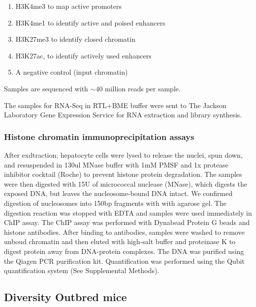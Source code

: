\documentclass[10pt,letterpaper]{article}
\providecommand{\tightlist}{%
  \setlength{\itemsep}{0pt}\setlength{\parskip}{0pt}}
\begin{document}
\begin{enumerate}
\def\labelenumi{\alph{enumi}.}
\tightlist
\item
  H3K4me3 to map active promoters
\item
  H3K4me1 to identify active and poised enhancers
\item
  H3K27me3 to identify closed chromatin
\item
  H3K27ac, to identify actively used enhancers
\item
  A negative control (input chromatin)
\end{enumerate}

Samples are sequenced with \(\sim40\) million reads per sample.

The samples for RNA-Seq in RTL+BME buffer were sent to The Jackson
Laboratory Gene Expression Service for RNA extraction and library
synthesis.

\hypertarget{histone-chromatin-immunoprecipitation-assays}{%
\subsubsection{Histone chromatin immunoprecipitation
assays}\label{histone-chromatin-immunoprecipitation-assays}}

After exdtraction, hepatocyte cells were lysed to release the nuclei,
spun down, and resuspended in 130ul MNase buffer with 1mM PMSF and 1x
protease inhibitor cocktail (Roche) to prevent histone protein
degradation. The samples were then digested with 15U of micrococcal
nuclease (MNase), which digests the exposed DNA, but leaves the
nucleosome-bound DNA intact. We confirmed digestion of nucleosomes into
150bp fragments with with agarose gel. The digestion reaction was
stopped with EDTA and samples were used immediately in ChIP assay. The
ChIP assay was performed with Dynabead Protein G beads and histone
antibodies. After binding to antibodies, samples were washed to remove
unboud chromatin and then eluted with high-salt buffer and proteinase K
to digest protein away from DNA-protein complexes. The DNA was purified
using the Qiagen PCR purification kit. Quantification was performed
using the Qubit quantification system (See Supplemental Methods).

\hypertarget{diversity-outbred-mice}{%
\subsection{Diversity Outbred mice}\label{diversity-outbred-mice}}
\end{document}
